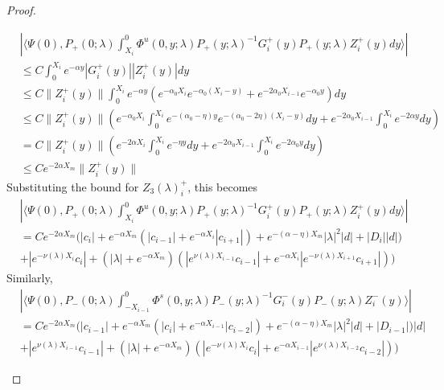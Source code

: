 \documentclass[thesis.tex]{subfiles}
\begin{document}
\begin{lemma}
\begin{proof}
\begin{enumerate}
\begin{align*}
&\left| \langle \Psi(0), P_+(0; \lambda) \int_{X_i}^0 \Phi^u(0, y; \lambda) P_+(y; \lambda)^{-1} G_i^+(y) P_+(y; \lambda) Z_i^+(y) dy \rangle \right| \\
&\leq C \int_0^{X_i} e^{-\alpha y} |G_i^+(y)| |Z_i^+(y)| dy \\
&\leq C \|Z_i^+(y)\| \int_0^{X_i} e^{-\alpha y} \left( e^{-\alpha_0 X_i} e^{-\alpha_0(X_i - y) } + e^{-2 \alpha_0 X_{i-1}} e^{-\alpha_0 y} \right) dy \\
&\leq C \|Z_i^+(y)\| \left( e^{-\alpha_0 X_i} \int_0^{X_i} e^{-(\alpha_0 - \eta) y}  e^{-(\alpha_0 - 2 \eta)(X_i - y) } dy + e^{-2\alpha_0 X_{i-1}} \int_0^{X_i} e^{-2 \alpha y}  dy \right) \\
&= C \|Z_i^+(y)\| \left( e^{-2 \alpha X_i } \int_0^{X_i} e^{-\eta y} dy + e^{-2\alpha_0 X_{i-1}} \int_0^{X_i} e^{-2 \alpha_0 y} dy \right) \\
&\leq C e^{-2 \alpha X_m } \|Z_i^+(y)\|
\end{align*}
Substituting the bound for $Z_3(\lambda)_i^+$, this becomes
\begin{align*}
&\left| \langle \Psi(0), P_+(0; \lambda) \int_{X_i}^0 \Phi^u(0, y; \lambda) P_+(y; \lambda)^{-1} G_i^+(y) P_+(y; \lambda) Z_i^+(y) dy \rangle \right| \\
&= C e^{-2 \alpha X_m } \Big(|c_i| + e^{-\alpha X_m}(|c_{i-1}| + e^{-\alpha X_i} |c_{i+1}|) + e^{-(\alpha - \eta) X_m}|\lambda|^2|d| + |D_i||d|) \\
&+ |e^{-\nu(\lambda)X_i} c_i| + (|\lambda| + e^{-\alpha X_m})(|e^{\nu(\lambda)X_{i-1}} c_{i-1}| + e^{-\alpha X_i} |e^{-\nu(\lambda)X_{i+1}} c_{i+1}|)\Big)
\end{align*}
Similarly,
\begin{align*}
&\left| \langle \Psi(0), P_-(0; \lambda) \int_{-X_{i-1}}^0 \Phi^s(0, y; \lambda) P_-(y; \lambda)^{-1} G_i^-(y) P_-(y; \lambda)Z_i^-(y) \rangle \right| \\
&= C e^{-2 \alpha X_m } \Big(|c_{i-1}| + e^{-\alpha X_m}(|c_i| + e^{-\alpha X_{i-1}} |c_{i-2}|) + e^{-(\alpha - \eta) X_m}|\lambda|^2|d| + |D_{i-1}|)|d| \\
&+ |e^{\nu(\lambda)X_{i-1}}c_{i-1}| + (|\lambda| + e^{-\alpha X_m})(|e^{-\nu(\lambda)X_i} c_i| + e^{-\alpha X_{i-1}} |e^{\nu(\lambda)X_{i-2}} c_{i-2}|)\Big) 
\end{align*}

\end{enumerate}


\end{proof}
\end{lemma}
\end{document}
